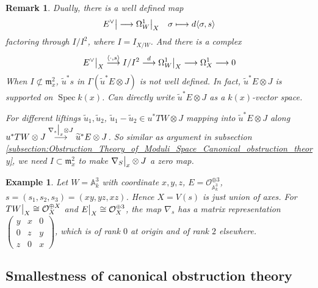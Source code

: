 \documentclass{ctexart}
\newtheorem{remark}{Remark}[section]
\newtheorem{example}{Example}[section]
\newcommand{\spec}{\operatorname{Spec}}
\begin{document}
\begin{remark}
    Dually, there is a well defined map 
    \begin{equation}
        E^{\vee}\big{|} \longrightarrow \Omega_{W}^{1}\big{|}_{X}\quad \sigma \longmapsto d\langle \sigma, s \rangle
    \end{equation}
    factoring through $I/I^{2}$, where $I = I_{X/W}$.
    And there is a complex
    \begin{equation}
        E^{\vee}\big{|}_{X} \overset{\langle \cdot, s \rangle}{\longrightarrow} I/I^{2} \overset{d}{\longrightarrow} \Omega_{W}^{1}\big{|}_{X} \longrightarrow \Omega_{X}^{1} \longrightarrow 0
    \end{equation}
    When $I \not\subset \mathfrak{m}_{x}^{2}$, $\widetilde{u}^{\ast}s$ in $\Gamma(\widetilde{u}^{\ast}E \otimes J)$ is not well defined.
    In fact, $\widetilde{u}^{\ast}E \otimes J$ is supported on $\spec k(x)$.
    Can directly write $\widetilde{u}^{\ast}E \otimes J$ as a $k(x)$-vector space.
    \par
    For different liftings $\widetilde{u}_{1}, \widetilde{u}_{2}$, $\widetilde{u}_{1} - \widetilde{u}_{2}\in u^{\ast}TW \otimes J$ mapping into $\widetilde{u}^{\ast}E \otimes J$ along $u^{\ast}TW \otimes J \overset{\nabla_{s}\big{|}_{x} \otimes J}{\longrightarrow} \widetilde{u}^{\ast}E \otimes J$.
    So similar as argument in subsection \ref{subsection:Obstruction_Theory_of_Moduli_Space_Canonical_obstruction_theory}, we need $I \subset \mathfrak{m}_{x}^{2}$ to make $\nabla_{S}\big{|}_{x} \otimes J$ a zero map. 
\end{remark}
\begin{example}
    Let $W = \mathbb{A}_{k}^{3}$ with coordinate $x, y, z$, $E = \mathcal{O}_{\mathbb{A}_{k}^{3}}^{\oplus 3}$, $s = (s_{1}, s_{2}, s_{3}) = (xy, yz, xz)$.
    Hence $X = V(s)$ is just union of axes.
    For $TW\big{|}_{X} \cong \mathcal{O}_{X}^{\oplus X}$ and $E\big{|}_{X} \cong \mathcal{O}_{X}^{\oplus 3}$, the map $\nabla_{s}$ has a matrix representation
    $
    \begin{pmatrix}
        y & x & 0 \\
        0 & z & y \\
        z & 0 & x 
    \end{pmatrix}
    $,
    which is of rank $0$ at origin and of rank $2$ elsewhere.
\end{example}

\subsection{Smallestness of canonical obstruction theory}
\label{subsection:Obstruction_Theory_of_Moduli_Space_Smallestness_of_canonical_obstruction_theory}
\end{document}
